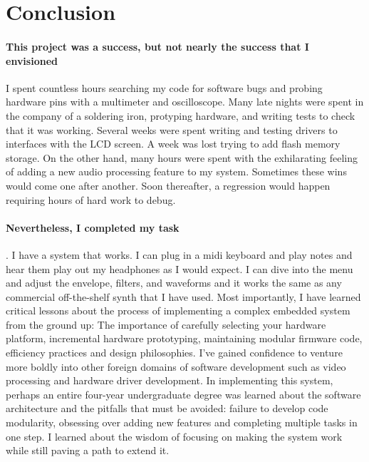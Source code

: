 \documentclass[acmlarge,screen]{acmart}
\begin{document}
\section{Conclusion}
	\paragraph{This project was a success, but not nearly the success that I envisioned} I spent countless hours searching my code for software bugs and probing hardware pins with a multimeter and oscilloscope. Many late nights were spent in the company of a soldering iron, protyping hardware, and writing tests to check that it was working. Several weeks were spent writing and testing drivers to interfaces with the LCD screen. A week was lost trying to add flash memory storage. On the other hand, many hours were spent with the exhilarating feeling of adding a new audio processing feature to my system. Sometimes these wins would come one after another. Soon thereafter, a regression would happen requiring hours of hard work to debug.
	
	\paragraph{Nevertheless, I completed my task}. I have a system that works. I can plug in a midi keyboard and play notes and hear them play out my headphones as I would expect. I can dive into the menu and adjust the envelope, filters, and waveforms and it works the same as any commercial off-the-shelf synth that I have used. Most importantly, I have learned critical lessons about the process of implementing a complex embedded system from the ground up: The importance of carefully selecting your hardware platform, incremental hardware prototyping, maintaining modular firmware code, efficiency practices and design philosophies. I've gained confidence to venture more boldly into other foreign domains of software development such as video processing and hardware driver development. In implementing this system, perhaps an entire four-year undergraduate degree was learned about the software architecture and the pitfalls that must be avoided: failure to develop code modularity, obsessing over adding new features and completing multiple tasks in one step. I learned about the wisdom of focusing on making the system work while still paving a path to extend it.
	
\end{document}
